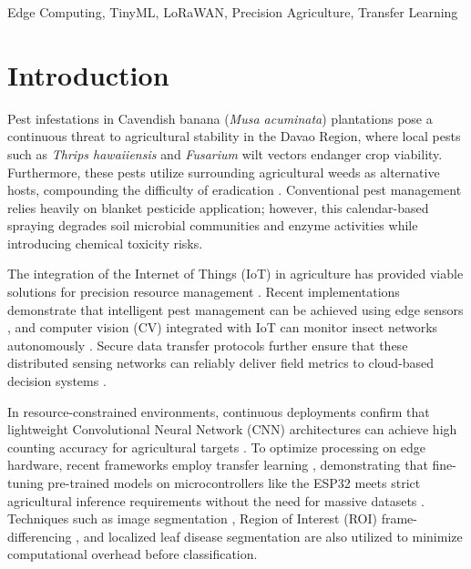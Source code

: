 \documentclass[conference]{IEEEtran}
\begin{document}
\vspace{1em}

\begin{IEEEkeywords}
Edge Computing, TinyML, LoRaWAN, Precision Agriculture, Transfer Learning
\end{IEEEkeywords}

\section{Introduction}
Pest infestations in Cavendish banana (\textit{Musa acuminata}) plantations pose a continuous threat to agricultural stability in the Davao Region, where local pests such as \textit{Thrips hawaiiensis} \cite{reyes2022} and \textit{Fusarium} wilt vectors \cite{nozawa2023} endanger crop viability. Furthermore, these pests utilize surrounding agricultural weeds as alternative hosts, compounding the difficulty of eradication \cite{vercellino2022}. Conventional pest management relies heavily on blanket pesticide application; however, this calendar-based spraying degrades soil microbial communities and enzyme activities \cite{liu2020} while introducing chemical toxicity risks.

The integration of the Internet of Things (IoT) in agriculture has provided viable solutions for precision resource management \cite{zeyliger2023}. Recent implementations demonstrate that intelligent pest management can be achieved using edge sensors \cite{ahmed2024}, and computer vision (CV) integrated with IoT can monitor insect networks autonomously \cite{cardoso2022}. Secure data transfer protocols further ensure that these distributed sensing networks can reliably deliver field metrics to cloud-based decision systems \cite{deoliveira2025}.

In resource-constrained environments, continuous deployments confirm that lightweight Convolutional Neural Network (CNN) architectures can achieve high counting accuracy for agricultural targets \cite{bereciartua2023}. To optimize processing on edge hardware, recent frameworks employ transfer learning \cite{hayajneh2023}, demonstrating that fine-tuning pre-trained models on microcontrollers like the ESP32 meets strict agricultural inference requirements without the need for massive datasets \cite{donskoy2025}. Techniques such as image segmentation \cite{singh2022}, Region of Interest (ROI) frame-differencing \cite{prasetyo2022}, and localized leaf disease segmentation \cite{chaudhari2023} are also utilized to minimize computational overhead before classification.
\end{document}
